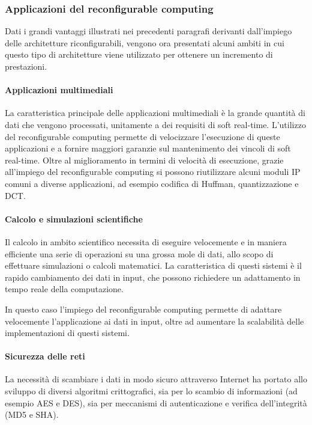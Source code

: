 
\subsubsection{Applicazioni del reconfigurable computing}
Dati i grandi vantaggi illustrati nei precedenti paragrafi derivanti dall'impiego delle
architetture riconfigurabili, vengono ora presentati alcuni ambiti in cui questo tipo
di architetture viene utilizzato per ottenere un incremento di prestazioni.

\paragraph{Applicazioni multimediali}
La caratteristica principale delle applicazioni multimediali è la grande quantità di dati che
vengono processati, unitamente a dei requisiti di soft real-time. L'utilizzo del reconfigurable
computing permette di velocizzare l'esecuzione di queste applicazioni e a fornire maggiori garanzie
sul mantenimento dei vincoli di soft real-time. Oltre al miglioramento
in termini di velocità di esecuzione, grazie all'impiego del reconfigurable computing si possono
riutilizzare alcuni moduli \ac{IP} comuni a diverse applicazioni, ad esempio codifica di
Huffman, quantizzazione e \ac{DCT}.

\paragraph{Calcolo e simulazioni scientifiche}
Il calcolo in ambito scientifico necessita di eseguire velocemente e in maniera efficiente
una serie di operazioni su una grossa mole di dati, allo scopo di effettuare simulazioni o
calcoli matematici. La caratteristica di questi sistemi è il rapido cambiamento dei dati in
input, che possono richiedere un adattamento in tempo reale della computazione.

In questo caso l'impiego del reconfigurable computing permette di adattare velocemente
l'applicazione ai dati in input, oltre ad aumentare la scalabilità delle implementazioni
di questi sistemi.


\paragraph{Sicurezza delle reti}
La necessità di scambiare i dati in modo sicuro attraverso Internet ha portato allo sviluppo
di diversi algoritmi crittografici, sia per lo scambio di informazioni (ad esempio
\ac{AES} e \ac{DES}), sia per meccanismi di autenticazione e verifica dell'integrità
(MD5 e \ac{SHA}).

